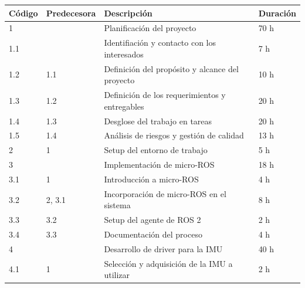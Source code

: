\documentclass[
11pt, %
codirector, %
]{charter}
\begin{document}
\begin{table}[htpb]
\centering
\label{tab:wbs}
\begin{tabular}{@{}llll@{}}
\toprule
\textbf{Código} & \textbf{Predecesora} & \textbf{Descripción}                               & \textbf{Duración} \\ \midrule
1               &                      & Planificación del proyecto                         & 70 h               \\
1.1             &                      & Identifiación y contacto con los interesados       & 7 h                \\
1.2             & 1.1                  & Definición del propósito y alcance del proyecto    & 10 h               \\
1.3             & 1.2                  & Definición de los requerimientos y entregables     & 20 h               \\
1.4             & 1.3                  & Desglose del trabajo en tareas                     & 20 h               \\
1.5             & 1.4                  & Análisis de riesgos y gestión de calidad           & 13 h               \\
2               & 1                    & Setup del entorno de trabajo                       & 5 h                \\
3               &                      & Implementación de micro-ROS                        & 18 h               \\
3.1             & 1                    & Introducción a micro-ROS                           & 4 h                \\
3.2             & 2, 3.1               & Incorporación de micro-ROS en el sistema           & 8 h                \\
3.3             & 3.2                  & Setup del agente de ROS 2                          & 2 h                \\
3.4             & 3.3                  & Documentación del proceso                          & 4 h                \\
4               &                      & Desarrollo de driver para la IMU                   & 40 h               \\
4.1             & 1                    & Selección y adquisición de la IMU a utilizar       & 2 h                \\

\end{tabular}
\end{table}
\end{document}
